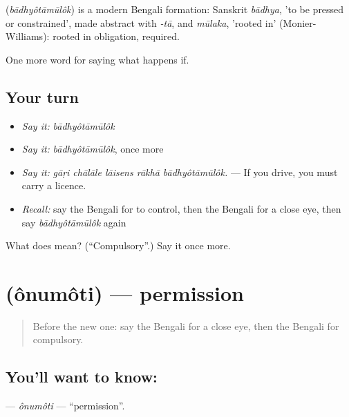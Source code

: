 \begin{cousinweb}
\textbf{} (\emph{bādhyôtāmūlôk}) is a modern Bengali formation: Sanskrit \emph{bādhya}, 'to be pressed or constrained', made abstract with \emph{-tā}, and \emph{mūlaka}, 'rooted in' (Monier-Williams): rooted in obligation, required.
\end{cousinweb}

\begin{grammarlens}[title={What you've built}]
One more word for saying what happens if.
\end{grammarlens}

\subsection*{Your turn}
\begin{itemize}
\raggedright
  \item \emph{Say it:} \emph{bādhyôtāmūlôk}
  \item \emph{Say it:} \emph{bādhyôtāmūlôk}, once more
  \item \emph{Say it:} \emph{gāṛi chālāle lāisens rākhā bādhyôtāmūlôk.} — If you drive, you must carry a licence.
  \item \emph{Recall:} say the Bengali for to control, then the Bengali for a close eye, then say \emph{bādhyôtāmūlôk} again
\end{itemize}

\begin{tcolorbox}[breakable,colback=teal!4,colframe=teal!35!black,title={Before you move on}]
What does  mean? (\textquotedblleft{}Compulsory\textquotedblright{}.) Say it once more.
\end{tcolorbox}
\section[\texorpdfstring{\bn{অনুমতি} (ônumôti)}{অনুমতি (ônumôti)}]{ (ônumôti) — permission}

\label{lesson:BN-C375-onumoti}



\begin{quote}
Before the new one: say the Bengali for a close eye, then the Bengali for compulsory.
\end{quote}

\subsection*{You'll want to know: }
\textbf{} — \emph{ônumôti} — \textquotedblleft{}permission\textquotedblright{}.

